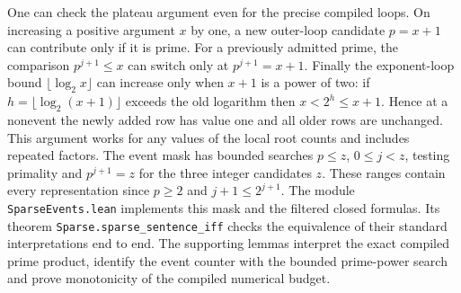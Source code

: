 One can check the plateau argument even for the precise compiled loops. On increasing a positive argument $x$ by one, a new outer-loop candidate $p=x+1$ can contribute only if it is prime. For a previously admitted prime, the comparison $p^{j+1}\le x$ can switch only at $p^{j+1}=x+1$. Finally the exponent-loop bound $\lfloor\log_2x\rfloor$ can increase only when $x+1$ is a power of two: if $h=\lfloor\log_2(x+1)\rfloor$ exceeds the old logarithm then $x<2^h\le x+1$. Hence at a nonevent the newly added row has value one and all older rows are unchanged. This argument works for any values of the local root counts and includes repeated factors. The event mask has bounded searches $p\le z$, $0\le j<z$, testing primality and $p^{j+1}=z$ for the three integer candidates $z$. These ranges contain every representation since $p\ge2$ and $j+1\le 2^{j+1}$. The module \texttt{SparseEvents.lean} implements this mask and the filtered closed formulas.
Its theorem \texttt{Sparse.sparse\_sentence\_iff} checks the equivalence of their standard interpretations end to end. The supporting lemmas interpret the exact compiled prime product, identify the event counter with the bounded prime-power search and prove monotonicity of the compiled numerical budget.
